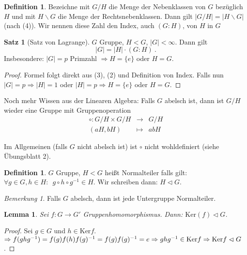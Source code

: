 \documentclass[12pt,a4paper]{article}
\newcounter{thmcounter}[subsection]
\newcounter{defcounter}[subsection]
\theoremstyle{definition}
\newtheorem{defi}[defcounter]{Definition}
\theoremstyle{remark}
\newtheorem*{bem}{Bemerkung}
\theoremstyle{definition}
\newtheorem{satz}[thmcounter]{Satz}
\theoremstyle{definition}
\theoremstyle{plain}
\theoremstyle{plain}
\newtheorem{lem}[thmcounter]{Lemma}
\begin{document}
\begin{defi}
	Bezeichne mit $G/H$ die Menge der Nebenklassen von $G$ bezüglich $H$ und mit $ H\backslash G$ die Menge der Rechtsnebenklassen. Dann gilt $|G/H| = |H\backslash G|$ (nach (4)). Wir nennen diese Zahl den Index, auch $(G:H)$, von $H$ in $G$
\end{defi}

\begin{satz}[Satz von Lagrange] \label{thm:lagrange}
	$G$ Gruppe, $H<G$, $|G|<\infty$. Dann gilt
	$$ |G| = |H|\cdot (G:H)\ .$$
	Insbesondere: $|G| = p$ Primzahl $\Rightarrow H = \{e\}$ oder $H = G$.
\end{satz}

\begin{proof}
	Formel folgt direkt aus (3), (2) und Definition von Index.
	Falls nun $|G| = p \Rightarrow |H| = 1$ oder $|H| = p\Rightarrow H = \{e\}$ oder $H = G$.
\end{proof}

\noindent Noch mehr Wissen aus der Linearen Algebra: Falls $G$ abelsch ist, dann ist $G/H$ wieder eine Gruppe mit Gruppenoperation
\begin{eqnarray*}
	\circ \colon G/H\times G/H &\to& G/H\\
	(aH,bH)&\mapsto& abH
\end{eqnarray*}

Im Allgemeinen (falls $G$ nicht abelsch ist) ist $\circ$ nicht wohldefiniert (siehe Übungsblatt 2).

\begin{defi}
	$G$ Gruppe, $H<G$ heißt Normalteiler falls gilt: $\forall g\in G, h\in H:\enspace g\circ h\circ g^{-1}\in H$. Wir schreiben dann: $H\vartriangleleft G$.
\end{defi}
\begin{bem}
	Falls $G$ abelsch, dann ist jede Untergruppe Normalteiler.
\end{bem}

\begin{lem}
	Sei $f\colon G\to G'$ Gruppenhomomorphismus.  Dann: $\text{Ker}(f)\vartriangleleft G$.
\end{lem}
\begin{proof}
	Sei $g\in G$ und $h\in \text{Ker}f$. $\Rightarrow f(ghg^{-1}) = f(g)f(h)f(g)^{-1} = \\f(g)f(g)^{-1} = e \Rightarrow ghg^{-1}\in \text{Ker}f\Rightarrow \text{Ker}f\vartriangleleft G$.
\end{proof}
\end{document}
